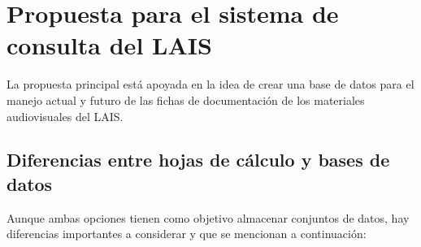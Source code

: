\documentclass[10pt,letterpaper]{article}
\begin{document}
\section{Propuesta para el sistema de consulta del LAIS}
La propuesta principal está apoyada en la idea de crear una base de datos para el manejo actual y futuro de las fichas de documentación de los materiales audiovisuales del LAIS.

\subsection{Diferencias entre hojas de cálculo y bases de datos}
Aunque ambas opciones tienen como objetivo almacenar conjuntos de datos, hay diferencias importantes a considerar y que se mencionan a continuación:

\end{document}
